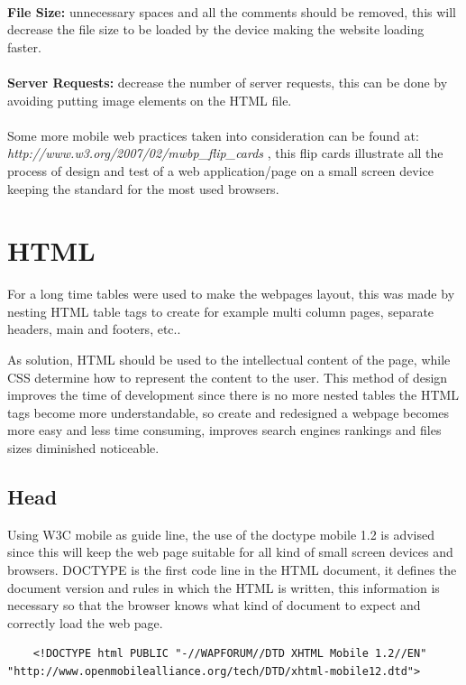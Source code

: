 \\\textbf{File Size:} unnecessary spaces and all the comments should be removed, this will decrease the file size to be loaded by the device making the website loading faster.\\
\\\textbf{Server Requests:} decrease the number of server requests, this can be done by avoiding putting image elements on the HTML file.
\\\\
Some more mobile web practices taken into consideration can be found at:
 \textit{http://www.w3.org/2007/02/mwbp\_flip\_cards} , this flip cards illustrate all the process of design and test of a web application/page on a small screen device keeping the standard for the most used browsers.

\section{HTML}

For a long time tables were used to make the webpages layout, this was made by nesting HTML table tags to create for example multi column pages, separate headers, main and footers, etc..

As solution, HTML should be used to the intellectual content of the page, while CSS determine how to represent the content to the user. This method of design improves the time of development since there is no more nested tables the HTML tags become more understandable, so create and redesigned a webpage becomes more easy and less time consuming, improves search engines rankings and files sizes diminished noticeable.

\subsection{Head} 
Using W3C mobile as guide line, the use of the doctype mobile 1.2 is advised since this will keep the web page suitable for all kind of small screen devices and browsers. DOCTYPE is the first code line in the HTML document, it defines the document version and rules in which the HTML is written, this information is necessary so that the browser knows what kind of document to expect and correctly load the web page. 

\begin{lstlisting}
	<!DOCTYPE html PUBLIC "-//WAPFORUM//DTD XHTML Mobile 1.2//EN" "http://www.openmobilealliance.org/tech/DTD/xhtml-mobile12.dtd">
\end{lstlisting}

